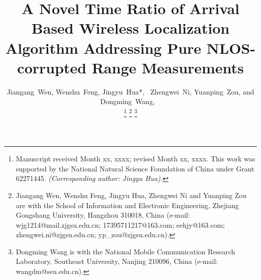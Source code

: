 \documentclass[journal]{IEEEtran}
\begin{document}
%
\title{A Novel Time Ratio of Arrival Based Wireless Localization Algorithm Addressing Pure NLOS-corrupted Range Measurements}
%
%
%
\author{Jiangang~Wen, Wenshu~Feng, Jingyu~Hua*,~ Zhengwei~Ni, Yuanping~Zou, and Dongming~Wang, ~%

\thanks{Manuscript received Month xx, xxxx; revised Month xx, xxxx. This work was supported by the National Natural Science Foundation of China under Grant 62271445. \textit{(Corresponding author: Jingyu Hua).}}%
\thanks{Jiangang Wen, Wenshu Feng, Jingyu Hua, Zhengwei Ni and Yuanping Zou are with the School of Information and Electronic Engineering, Zhejiang Gongshang University, Hangzhou 310018, China (e-mail: wjg1214@mail.zjgsu.edu.cn; 17395711217@163.com; eehjy@163.com; zhengwei.ni@zjgsu.edu.cn; yp\_zou@zjgsu.edu.cn).}%
\thanks{Dongming Wang is with the National Mobile Communication Research Laboratory, Southeast University, Nanjing 210096, China (e-mail: wangdm@seu.edu.cn).}}


%
%
\end{document}
